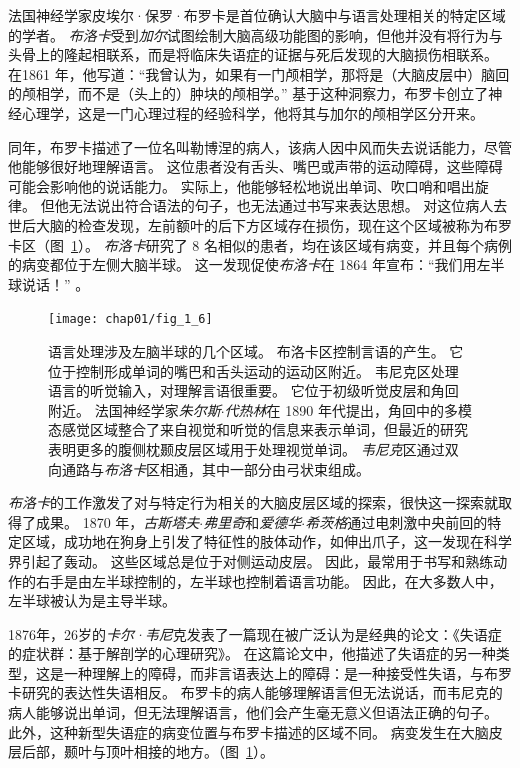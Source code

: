 法国神经学家皮埃尔·保罗·布罗卡是首位确认大脑中与语言处理相关的特定区域的学者。
\textit{布洛卡}受到\textit{加尔}试图绘制大脑高级功能图的影响，但他并没有将行为与头骨上的隆起相联系，而是将临床失语症的证据与死后发现的大脑损伤相联系。
在1861 年，他写道：“我曾认为，如果有一门颅相学，那将是（大脑皮层中）脑回的颅相学，而不是（头上的）肿块的颅相学。” 
基于这种洞察力，布罗卡创立了神经心理学，这是一门心理过程的经验科学，他将其与加尔的颅相学区分开来。


同年，布罗卡描述了一位名叫勒博涅的病人，该病人因中风而失去说话能力，尽管他能够很好地理解语言。
这位患者没有舌头、嘴巴或声带的运动障碍，这些障碍可能会影响他的说话能力。
实际上，他能够轻松地说出单词、吹口哨和唱出旋律。
但他无法说出符合语法的句子，也无法通过书写来表达思想。
对这位病人去世后大脑的检查发现，左前额叶的后下方区域存在损伤，现在这个区域被称为布罗卡区（图~\ref{fig:1_6}）。
\textit{布洛卡}研究了 8 名相似的患者，均在该区域有病变，并且每个病例的病变都位于左侧大脑半球。
这一发现促使\textit{布洛卡}在 1864 年宣布：“我们用左半球说话！” 。


\begin{figure}[htbp]
	\centering
	\texttt{[image: chap01/fig\_1\_6]}
	\caption{语言处理涉及左脑半球的几个区域。
		布洛卡区控制言语的产生。
		它位于控制形成单词的嘴巴和舌头运动的运动区附近。
		韦尼克区处理语言的听觉输入，对理解言语很重要。
		它位于初级听觉皮层和角回附近。
		法国神经学家\textit{朱尔斯$\cdot$代热林}在 1890 年代提出，角回中的多模态感觉区域整合了来自视觉和听觉的信息来表示单词，但最近的研究表明更多的腹侧枕颞皮层区域用于处理视觉单词。
		\textit{韦尼克}区通过双向通路与\textit{布洛卡}区相通，其中一部分由弓状束组成\cite{geschwind1979specializations}。}
	\label{fig:1_6}
\end{figure}


\textit{布洛卡}的工作激发了对与特定行为相关的大脑皮层区域的探索，很快这一探索就取得了成果。
1870 年，\textit{古斯塔夫$\cdot$弗里奇}和\textit{爱德华$\cdot$希茨格}通过电刺激中央前回的特定区域，成功地在狗身上引发了特征性的肢体动作，如伸出爪子，这一发现在科学界引起了轰动。
这些区域总是位于对侧运动皮层。
因此，最常用于书写和熟练动作的右手是由左半球控制的，左半球也控制着语言功能。
因此，在大多数人中，左半球被认为是主导半球。



1876年，26岁的\textit{卡尔·韦尼}克发表了一篇现在被广泛认为是经典的论文：《失语症的症状群：基于解剖学的心理研究》。
在这篇论文中，他描述了失语症的另一种类型，这是一种理解上的障碍，而非言语表达上的障碍：是一种接受性失语，与布罗卡研究的表达性失语相反。
布罗卡的病人能够理解语言但无法说话，而韦尼克的病人能够说出单词，但无法理解语言，他们会产生毫无意义但语法正确的句子。
此外，这种新型失语症的病变位置与布罗卡描述的区域不同。
病变发生在大脑皮层后部，颞叶与顶叶相接的地方。（图~\ref{fig:1_6}）。



